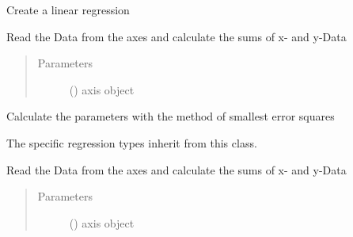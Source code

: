 \documentclass[letterpaper,10pt,english]{sphinxmanual}
\begin{document}

\begin{fulllineitems}
\label{\detokenize{DataAnalyzer.Plot:DataAnalyzer.Plot.cl_regression.Linear}}
Create a linear regression

Read the Data from the axes and calculate the sums of x- and y-Data
\begin{quote}\begin{description}
\item[{Parameters}] \leavevmode
{} () \textendash{} axis object

\end{description}\end{quote}

\begin{fulllineitems}
\label{\detokenize{DataAnalyzer.Plot:DataAnalyzer.Plot.cl_regression.Linear.fit}}
Calculate the parameters with the method of smallest error squares

\end{fulllineitems}


\end{fulllineitems}


\begin{fulllineitems}
\label{\detokenize{DataAnalyzer.Plot:DataAnalyzer.Plot.cl_regression.Regression}}
The specific regression types inherit from this class.

Read the Data from the axes and calculate the sums of x- and y-Data
\begin{quote}\begin{description}
\item[{Parameters}] \leavevmode
{} () \textendash{} axis object

\end{description}\end{quote}

\end{fulllineitems}
\end{document}
